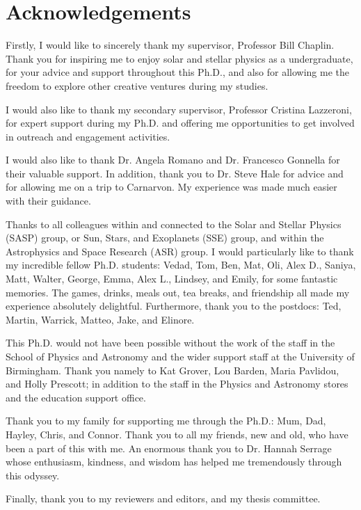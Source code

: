 \chapter*{Acknowledgements}
\thispagestyle{plain}

Firstly, I would like to sincerely thank my supervisor, Professor Bill Chaplin. Thank you for inspiring me to enjoy solar and stellar physics as a undergraduate, for your advice and support throughout this Ph.D., and also for allowing me the freedom to explore other creative ventures during my studies.

I would also like to thank my secondary supervisor, Professor Cristina Lazzeroni, for expert support during my Ph.D. and offering me opportunities to get involved in outreach and engagement activities.

I would also like to thank Dr. Angela Romano and Dr. Francesco Gonnella for their valuable support. In addition, thank you to Dr. Steve Hale for advice and for allowing me on a trip to Carnarvon. My experience was made much easier with their guidance.

Thanks to all colleagues within and connected to the Solar and Stellar Physics (SASP) group, or Sun, Stars, and Exoplanets (SSE) group, and within the Astrophysics and Space Research (ASR) group. I would particularly like to thank my incredible fellow Ph.D. students: Vedad, Tom, Ben, Mat, Oli, Alex D., Saniya, Matt, Walter, George, Emma, Alex L., Lindsey, and Emily, for some fantastic memories. The games, drinks, meals out, tea breaks, and friendship all made my experience absolutely delightful. Furthermore, thank you to the postdocs: Ted, Martin, Warrick, Matteo, Jake, and Elinore.

This Ph.D. would not have been possible without the work of the staff in the School of Physics and Astronomy and the wider support staff at the University of Birmingham. Thank you namely to Kat Grover, Lou Barden, Maria Pavlidou, and Holly Prescott; in addition to the staff in the Physics and Astronomy stores and the education support office.

Thank you to my family for supporting me through the Ph.D.: Mum, Dad, Hayley, Chris, and Connor. Thank you to all my friends, new and old, who have been a part of this with me. An enormous thank you to Dr. Hannah Serrage whose enthusiasm, kindness, and wisdom has helped me tremendously through this odyssey.

Finally, thank you to my reviewers and editors, and my thesis committee.